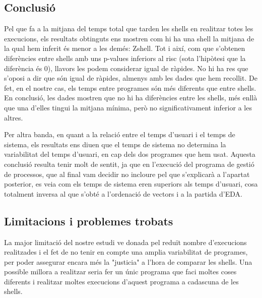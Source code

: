 \documentclass[12pt]{article}
\begin{document}
\subsection{Conclusió}
Pel que fa a la mitjana del temps total que tarden les shells en realitzar totes les execucions, els resultats obtinguts ens mostren com hi ha una shell la mitjana 
de la qual hem inferit és menor a les demés: Zshell. Tot i així, com que s'obtenen diferències entre shells amb uns p-values inferiors al risc (sota l'hipòtesi que la
diferència és 0), llavors les podem considerar igual de ràpides. No hi ha res que s'oposi a dir que són igual de ràpides, almenys amb les dades que hem recollit. De fet, en el 
nostre cas, els temps entre programes són més diferents que entre shells. En conclusió, les dades mostren que no hi ha diferències entre les shells, més enllà que una d'elles
tingui la mitjana mínima, però no significativament inferior a les altres. \break

Per altra banda, en quant a la relació entre el temps d'usuari i el temps de sistema, els resultats ens diuen que el temps de sistema no determina la variabilitat 
del temps d'usuari, en cap dels dos programes que hem usat. Aquesta conclusió resulta tenir molt de sentit, ja que en l'execució del programa de gestió de processos, que 
al final vam decidir no incloure pel que s'explicarà a l'apartat posterior, es veia com els temps de sistema eren superiors als temps d'usuari, cosa totalment inversa al que 
s'obté a l'ordenació de vectors i a la partida d'EDA.

\subsection{Limitacions i problemes trobats}
La major limitació del nostre estudi ve donada pel reduït nombre d'execucions realitzades i el fet de no tenir en compte una amplia variabilitat de programes, per poder assegurar
encara més la "justicia" a l'hora de comparar les shells. Una possible millora a realitzar seria fer un únic programa que faci moltes coses diferents i realitzar moltes execucions
d'aquest programa a cadascuna de les shells.
\end{document}
